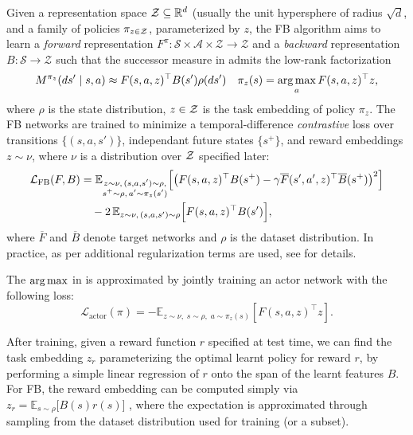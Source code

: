 Given a representation space ${\mathcal{Z}} \subseteq {\mathbb{R}}^d$ (usually the unit hypersphere of radius $\sqrt{d}$, and a family of policies $\pi_{z\in{\mathcal{Z}}}$, parameterized by $z$, the FB algorithm aims to learn a \textit{forward} representation $F^\pi : \mathcal{S} \times \mathcal{A} \times \mathcal{Z} \to \mathcal{Z}$ and a \textit{backward} representation $B : \mathcal{S} \to \mathcal{Z}$
such that the successor measure in  admits the low-rank factorization
\begin{equation}
\label{eq:fb_factorization}
M^{\pi_z}(ds' \mid s,a) \approx  F(s,a,z)^\top B(s')\rho(ds') \quad \pi_z(s) = \operatorname*{arg\,max}_a F(s,a,z)^\top z,
\end{equation}
where $\rho$ is the state distribution, $z \in {\mathcal{Z}}$ is the task embedding of policy $\pi_z$.
The FB networks are trained to minimize a temporal-difference \textit{contrastive} loss over transitions $\{(s,a,s')\}$, independant future states $\{s^+\}$, and reward embeddings $z\sim \nu$, where $\nu$ is a distribution over ${\mathcal{Z}}$ specified later:
\begin{align}
\label{eq:fb_loss}
\mathcal{L}_{\text{FB}}(F,B)
&=
\mathbb{E}_{\substack{
z\sim\nu,\,
(s,a,s')\sim\rho,\\
s^+\sim\rho,\,
a'\sim\pi_z(s')
}}
\Big[
\big(
F(s,a,z)^\top B(s^+)
-
\gamma
\overline{F}(s',a',z)^\top
\overline{B}(s^+)
\big)^2
\Big] \notag \\
&\quad
-
2\,\mathbb{E}_{z\sim\nu,\,(s,a,s')\sim\rho}
\Big[
F(s,a,z)^\top B(s')
\Big],
\end{align}
where $\overline{F}$ and $\overline{B}$ denote target networks and $\rho$ is the dataset distribution. In practice, as per \citet{touati2023does} additional regularization terms are used, see  for details. 

The $\operatorname*{arg\,max}$ in  is approximated by jointly training an actor network with the following loss:
\begin{equation}
\label{eq:actor_loss}
\mathcal{L}_{\text{actor}}(\pi)=-\mathbb{E}_{z\sim\nu,\; s\sim\rho,\; a\sim\pi_z(s)}
\left[
F(s,a,z)^\top z
\right].
\end{equation}

After training, given a reward function $r$ specified at test time, we can find the task embedding $z_r$ parameterizing the optimal learnt policy for reward $r$, by performing a simple linear regression of $r$ onto the span of the learnt features $B$. For FB, the reward embedding can be computed simply via $z_r = \mathbb{E}_{s\sim\rho}\big[B(s)r(s)\big]$ \citep{touati2021learning}, where the expectation is approximated through sampling from the dataset distribution used for training (or a subset).

